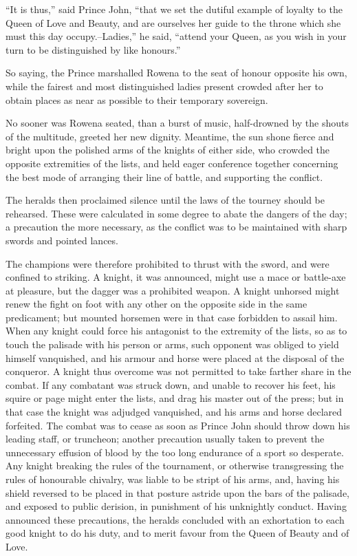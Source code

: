 ``It is thus,'' said Prince John, ``that we set the dutiful example of
loyalty to the Queen of Love and Beauty, and are ourselves her guide to
the throne which she must this day occupy.--Ladies,'' he said, ``attend
your Queen, as you wish in your turn to be distinguished by like
honours.''

So saying, the Prince marshalled Rowena to the seat of honour opposite
his own, while the fairest and most distinguished ladies present crowded
after her to obtain places as near as possible to their temporary
sovereign.

No sooner was Rowena seated, than a burst of music, half-drowned by the
shouts of the multitude, greeted her new dignity. Meantime, the sun
shone fierce and bright upon the polished arms of the knights of either
side, who crowded the opposite extremities of the lists, and held eager
conference together concerning the best mode of arranging their line of
battle, and supporting the conflict.

The heralds then proclaimed silence until the laws of the tourney should
be rehearsed. These were calculated in some degree to abate the dangers
of the day; a precaution the more necessary, as the conflict was to be
maintained with sharp swords and pointed lances.

The champions were therefore prohibited to thrust with the sword, and
were confined to striking. A knight, it was announced, might use a mace
or battle-axe at pleasure, but the dagger was a prohibited weapon. A
knight unhorsed might renew the fight on foot with any other on the
opposite side in the same predicament; but mounted horsemen were in that
case forbidden to assail him. When any knight could force his antagonist
to the extremity of the lists, so as to touch the palisade with his
person or arms, such opponent was obliged to yield himself vanquished,
and his armour and horse were placed at the disposal of the conqueror. A
knight thus overcome was not permitted to take farther share in the
combat. If any combatant was struck down, and unable to recover his
feet, his squire or page might enter the lists, and drag his master out
of the press; but in that case the knight was adjudged vanquished, and
his arms and horse declared forfeited. The combat was to cease as soon
as Prince John should throw down his leading staff, or truncheon;
another precaution usually taken to prevent the unnecessary effusion of
blood by the too long endurance of a sport so desperate. Any knight
breaking the rules of the tournament, or otherwise transgressing the
rules of honourable chivalry, was liable to be stript of his arms, and,
having his shield reversed to be placed in that posture astride upon the
bars of the palisade, and exposed to public derision, in punishment of
his unknightly conduct. Having announced these precautions, the heralds
concluded with an exhortation to each good knight to do his duty, and to
merit favour from the Queen of Beauty and of Love.

